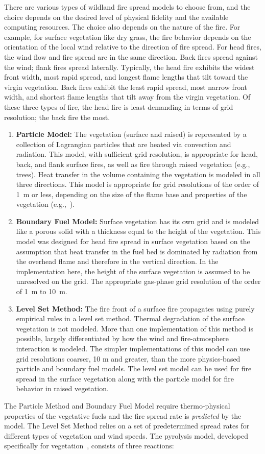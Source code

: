 \documentclass[journal,article,atmosphere,submit,moreauthors,pdftex]{Definitions/mdpi}
\begin{document}
There are various types of wildland fire spread models to choose from, and the choice depends on the desired level of physical fidelity and the available computing resources. The choice also depends on the nature of the fire. For example, for surface vegetation like dry grass, the fire behavior depends on the orientation of the local wind relative to the direction of fire spread. For head fires, the wind flow and fire spread are in the same direction. Back fires spread against the wind; flank fires spread laterally. Typically, the head fire exhibits the widest front width, most rapid spread, and longest flame lengths that tilt toward the virgin vegetation. Back fires exhibit the least rapid spread, most narrow front width, and shortest flame lengths that tilt away from the virgin vegetation. Of these three types of fire, the head fire is least demanding in terms of grid resolution; the back fire the most.
\begin{enumerate}
\item {\bf Particle Model:} The vegetation (surface and raised) is represented by a collection of Lagrangian particles that are heated via convection and radiation. This model, with sufficient grid resolution, is appropriate for head, back, and flank surface fires, as well as fire through raised vegetation (e.g., trees). Heat transfer in the volume containing the vegetation is modeled in all three directions. This model is appropriate for grid resolutions of the order of 1~m or less, depending on the size of the flame base and properties of the vegetation (e.g.,~\cite{Perez-Ramirez:FT2017}).
\item {\bf Boundary Fuel Model:} Surface vegetation has its own grid and is modeled like a porous solid with a thickness equal to the height of the vegetation. This model was designed for head fire spread in surface vegetation based on the assumption that heat transfer in the fuel bed is dominated by radiation from the overhead flame and therefore in the vertical direction.  In the implementation here, the height of the surface vegetation is assumed to be unresolved on the grid. The appropriate gas-phase grid resolution of the order of 1~m to 10~m.
\item {\bf Level Set Method:} The fire front of a surface fire propagates using purely empirical rules in a level set method. Thermal degradation of the surface vegetation is not modeled. More than one implementation of this method is possible, largely differentiated by how the wind and fire-atmosphere interaction is modeled. The simpler implementations of this model can use grid resolutions coarser, 10 m and greater, than the more physics-based particle and boundary fuel models. The level set model can be used for fire spread in the surface vegetation along with the particle model for fire behavior in raised vegetation. 
\end{enumerate}
The Particle Method and Boundary Fuel Model require thermo-physical properties of the vegetative fuels and the fire spread rate is {\em predicted} by the model. The Level Set Method relies on a set of predetermined spread rates for different types of vegetation and wind speeds. The pyrolysis model, developed specifically for vegetation~\cite{Porterie:2006,Morvan:CF2004,Houssami:2016}, consists of three reactions:
\end{document}
